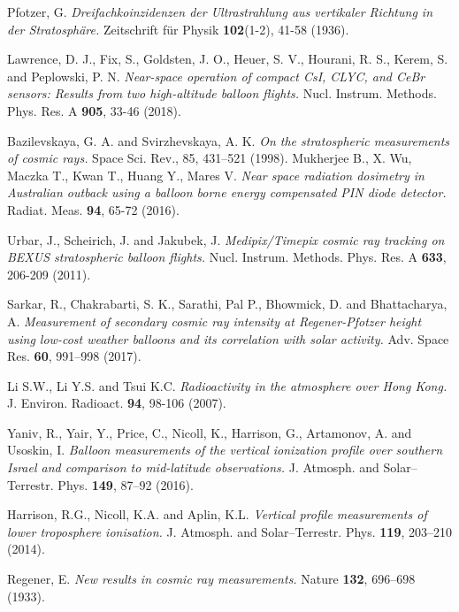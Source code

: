 \documentclass{Rpd}
\begin{document}
\begin{thebibliography}{99.}%

 Pfotzer, G. {\it Dreifachkoinzidenzen der Ultrastrahlung aus vertikaler Richtung in der Stratosphäre.} Zeitschrift für Physik {\bf 102}(1-2), 41-58 (1936).

 Lawrence, D. J., Fix, S., Goldsten, J. O., Heuer, S. V., Hourani, R. S., Kerem, S. and Peplowski, P. N. {\it Near-space operation of compact CsI, CLYC, and CeBr sensors: Results from two high-altitude balloon flights.} Nucl. Instrum. Methods. Phys. Res. A {\bf 905}, 33-46 (2018).

 Bazilevskaya, G. A. and Svirzhevskaya, A. K. {\it On the stratospheric measurements of cosmic rays.} Space Sci. Rev., 85, 431–521 (1998).
 Mukherjee B., X. Wu, Maczka T., Kwan T., Huang Y., Mares V. {\it Near space radiation dosimetry in Australian outback using a balloon borne energy compensated PIN diode detector.} Radiat. Meas. {\bf 94}, 65-72 (2016). 

 Urbar, J., Scheirich, J. and Jakubek, J. {\it Medipix/Timepix cosmic ray tracking on BEXUS stratospheric balloon flights.} Nucl. Instrum. Methods. Phys. Res. A {\bf 633}, 206-209 (2011). 

 Sarkar, R., Chakrabarti, S. K., Sarathi, Pal P., Bhowmick, D. and Bhattacharya, A. {\it Measurement of secondary cosmic ray intensity at Regener-Pfotzer height using low-cost weather balloons and its correlation with solar activity.} Adv. Space Res. {\bf 60}, 991–998 (2017). 

 Li S.W., Li Y.S. and Tsui K.C. {\it Radioactivity in the atmosphere over Hong Kong.} J. Environ. Radioact. {\bf 94}, 98-106 (2007). 
	
 Yaniv, R., Yair, Y., Price, C., Nicoll, K., Harrison, G., Artamonov, A. and Usoskin, I. {\it Balloon measurements of the vertical ionization profile over southern Israel and comparison to mid-latitude observations.} J. Atmosph. and Solar–Terrestr. Phys. {\bf 149}, 87–92 (2016). 

 Harrison, R.G., Nicoll, K.A. and Aplin, K.L. {\it Vertical profile measurements of lower troposphere ionisation.} J. Atmosph. and Solar–Terrestr. Phys. {\bf 119}, 203–210 (2014). 

 Regener, E. {\it New results in cosmic ray measurements.} Nature {\bf 132}, 696–698 (1933).


\end{thebibliography}
\end{document}
